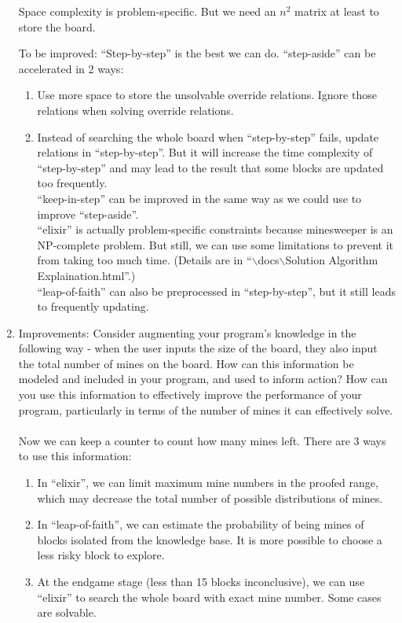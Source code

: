 \documentclass[letter]{article}
\begin{document}
\begin{enumerate}
	Space complexity is problem-specific. But we need an $ n^2 $ matrix at least to store the board.
	
	To be improved: 
	``Step-by-step'' is the best we can do.
	``step-aside'' can be accelerated in 2 ways:
	\begin{enumerate}
		\item {Use more space to store the unsolvable override relations. Ignore those relations when solving override relations.}
		\item {Instead of searching the whole board when ``step-by-step'' fails, update relations in ``step-by-step''. But it will increase the time complexity of ``step-by-step'' and may lead to the result that some blocks are updated too frequently. \\ 
		``keep-in-step'' can be improved in the same way as we could use to improve ``step-aside''. \\
		``elixir'' is actually problem-specific constraints because minesweeper is an NP-complete problem. But still, we can use some limitations to prevent it from taking too much time. (Details are in ``$ \backslash $docs$ \backslash $Solution Algorithm Explaination.html''.) \\
		``leap-of-faith'' can also be preprocessed in ``step-by-step'', but it still leads to frequently updating.}
	\end{enumerate}
	
	\item {Improvements: Consider augmenting your program’s knowledge in the following way - when the user inputs the size of the board, they also input the total number of mines on the board. How can this information be modeled and included in your program, and used to inform action? How can you use this information to effectively improve the performance of your program, particularly in terms of the number of mines it can effectively solve.} \\
	\\
	Now we can keep a counter to count how many mines left.
	There are 3 ways to use this information:
	\begin{enumerate}
		\item {In ``elixir'', we can limit maximum mine numbers in the proofed range, which may decrease the total number of possible distributions of mines.}
		\item {In ``leap-of-faith'', we can estimate the probability of being mines of blocks isolated from the knowledge base. It is more possible to choose a less risky block to explore.}
		\item {At the endgame stage (less than 15 blocks inconclusive), we can use ``elixir'' to search the whole board with exact mine number. Some cases are solvable.}
	\end{enumerate}

\end{enumerate}
\end{document}
